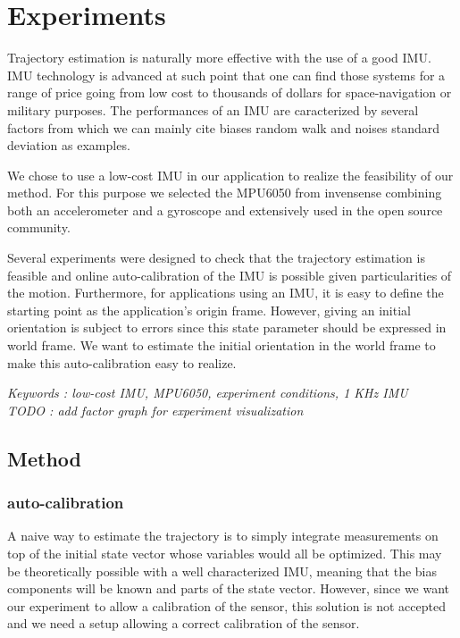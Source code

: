 
\section{Experiments} \label{sec:experiments}

Trajectory estimation is naturally more effective with the use of a good IMU. IMU technology is advanced at such point that 
one can find those systems for a range of price going from low cost to thousands of dollars for space-navigation or military purposes.
The performances of an IMU are caracterized by several factors from which we can mainly cite biases random walk and noises standard deviation
as examples.

We chose to use a low-cost IMU in our application to realize the feasibility of our method. For this purpose we selected the 
MPU6050 from invensense combining both an accelerometer and a gyroscope and extensively used in the open source community.

Several experiments were designed to check that the trajectory estimation is feasible and online auto-calibration of the IMU is possible given particularities of the motion.
Furthermore, for applications using an IMU, it is easy to define the starting point as the application's origin frame. However, giving an initial orientation is subject to errors since this state parameter should be expressed in world frame.
We want to estimate the initial orientation in the world frame to make this auto-calibration easy to realize. 

\textit{Keywords : low-cost IMU, MPU6050, experiment conditions, 1 KHz IMU} \\
\textit{TODO : add factor graph for experiment visualization}

\subsection{Method}
\subsubsection{auto-calibration}
A naive way to estimate the trajectory is to simply integrate measurements on top of the initial state vector whose variables would all be optimized. 
This may be theoretically possible with a well characterized IMU, meaning that the bias components will be known and parts of the state vector.
However, since we want our experiment to allow a calibration of the sensor, this solution is not accepted and we need a setup allowing a correct calibration of the sensor.

